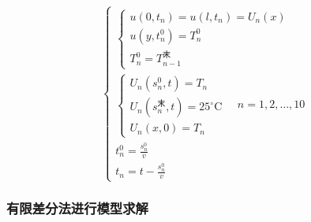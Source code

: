 \documentclass[withoutpreface,bwprint]{cumcmthesis} %
\numberwithin{equation}{subsection}
\begin{document}
\begin{equation}
	\left\{\begin{array}{l}
		\left\{\begin{array}{l}
		u\left(0, t_{n}\right)=u\left(l, t_{n}\right)=U_{n}(x) \\
		u\left(y, t_{n}^{0}\right)=T_{n}^{0} \\
		T_{n}^{0}=T_{n-1}^{\text {末}}
		\end{array}\right. \\
		\left\{\begin{array}{l}
		U_{n}\left(s_{n}^{0}, t\right)=T_{n} \\
		U_{n}\left(s_{n}^{\text {末}}, t\right)=25^{\circ} \mathrm{C} \\
		U_{n}(x, 0)=T_{n}
		\end{array} \quad n=1,2, \ldots, 10\right.\\
		t_{n}^{0}=\frac{s_{n}^{0}}{v} \\
		t_{n}=t-\frac{s_{n}^{0}}{v}
	\end{array}\right.
\end{equation}


\subsubsection{有限差分法\cite{lishan2020}进行模型求解}
\end{document}
